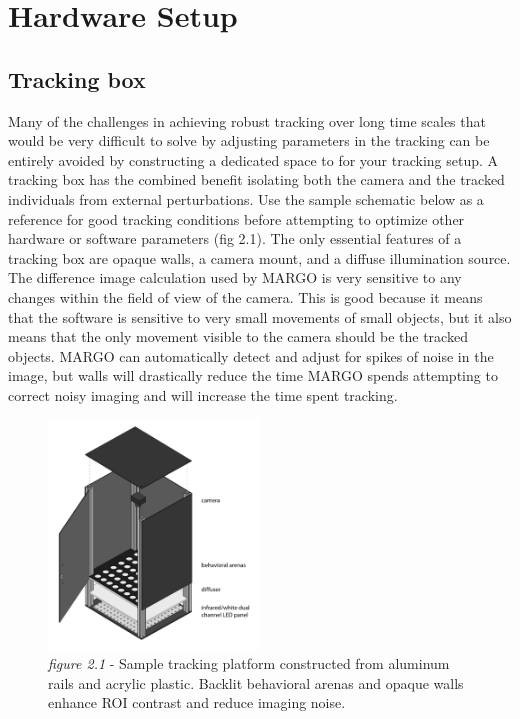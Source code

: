 \documentclass[11pt]{article}
\begin{document}
\section{Hardware Setup}

\subsection{Tracking box}

Many of the challenges in achieving robust tracking over long time scales that would be very difficult to solve by adjusting parameters in the tracking can be entirely avoided by constructing a dedicated space to for your tracking setup. A tracking box has the combined benefit isolating both the camera and the tracked individuals from external perturbations. Use the sample schematic below as a reference for good tracking conditions before attempting to optimize other hardware or software parameters (fig 2.1). The only essential features of a tracking box are opaque walls, a camera mount, and a  diffuse illumination source. The difference image calculation used by MARGO is very sensitive to any changes within the field of view of the camera. This is good because it means that the software is sensitive to very small movements of small objects, but it also means that the only movement visible to the camera should be the tracked objects. MARGO can automatically detect and adjust for spikes of noise in the image, but walls will drastically reduce the time MARGO spends attempting to correct noisy imaging and will increase the time spent tracking.

\begin{figure}[h!]
	\begin{center}
		\includegraphics[width=0.5\textwidth]{images/Hardware Setup/Tracking box/behavioral_box_isometric_painted_labels.pdf}
		\caption*{\footnotesize {\textit{figure 2.1} - Sample tracking platform constructed from aluminum rails and acrylic plastic. Backlit behavioral arenas and opaque walls enhance ROI contrast and reduce imaging noise.}}
	\end{center}
\end{figure}
\end{document}
